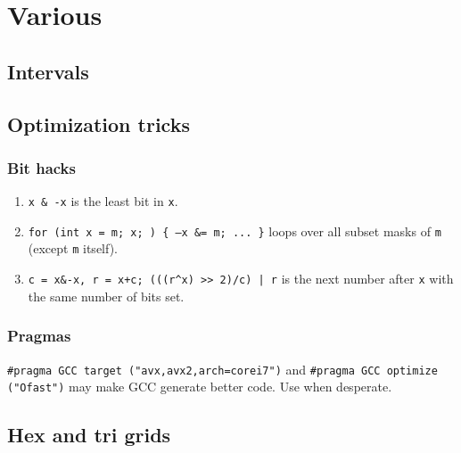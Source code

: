 
\chapter{Various}

	\section{Intervals}

	\section{Optimization tricks}
		\subsection{Bit hacks}
			\begin{enumerate}
			\item \texttt{x \& -x} is the least bit in \texttt{x}.
			\item \texttt{for (int x = m; x; ) \{ --x \&= m; ... \}} loops over all subset masks of \texttt{m} (except \texttt{m} itself).
			\item \texttt{c = x\&-x, r = x+c; (((r\^{}x) >> 2)/c) | r} is the next number after \texttt{x} with the same number of bits set.
			\end{enumerate}
		\subsection{Pragmas}
			\lstinline{#pragma GCC target ("avx,avx2,arch=corei7")} and \lstinline{#pragma GCC optimize ("Ofast")} may make GCC generate better code. Use when desperate.

	\section{Hex and tri grids}
